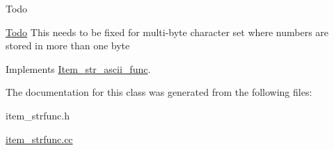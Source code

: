 \begin{DoxyRefDesc}{Todo}
\item[\mbox{\hyperlink{todo__todo000035}{Todo}}]This needs to be fixed for multi-\/byte character set where numbers are stored in more than one byte \end{DoxyRefDesc}


Implements \mbox{\hyperlink{classItem__str__ascii__func}{Item\+\_\+str\+\_\+ascii\+\_\+func}}.



The documentation for this class was generated from the following files\+:\begin{DoxyCompactItemize}
\item 
item\+\_\+strfunc.\+h\item 
\mbox{\hyperlink{item__strfunc_8cc}{item\+\_\+strfunc.\+cc}}\end{DoxyCompactItemize}
